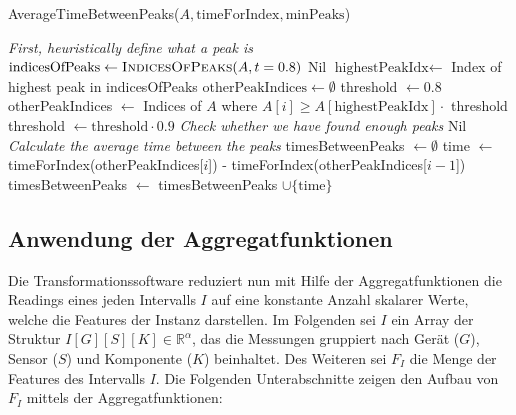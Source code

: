 \begin{algorithm}[hp]
    \caption{AverageTimeBetweenPeaks($A, \text{timeForIndex}, \text{minPeaks}$)}
    \label{algo:avgTimeBetweenPeaks}
    \begin{algorithmic}
        \State \LeftComment \textit{First, heuristically define what a peak is}
        \State $\text{indicesOfPeaks} \gets \Call{IndicesOfPeaks}{A, t = 0.8}$
            \State \Return Nil
        \EndIf
        \State $\text{highestPeakIdx} \gets$ Index of highest peak in indicesOfPeaks
        \State {}
        \State $\text{otherPeakIndices} \gets \emptyset$
        \State threshold $\gets 0.8$
        \Repeat
            \State otherPeakIndices $\gets$ Indices of $A$ where $A[i] \geq A[\text{highestPeakIdx}] \cdot $ threshold
            \State threshold $\gets \text{threshold} \cdot 0.9$
        \State \LeftComment \textit{Check whether we have found enough peaks}
            \State \Return Nil
        \EndIf
        \State \LeftComment \textit{Calculate the average time between the peaks}
        \State timesBetweenPeaks $\gets \emptyset$
            \State time $\gets$ timeForIndex(otherPeakIndices[$i$]) - timeForIndex(otherPeakIndices[$i - 1$])
            \State timesBetweenPeaks $\gets$ timesBetweenPeaks $\cup \{\text{time}\}$
        \EndFor
        \State \Return {}
    \end{algorithmic}
\end{algorithm}

\newpage

\subsection{Anwendung der Aggregatfunktionen}
Die Transformationssoftware reduziert nun mit Hilfe der Aggregatfunktionen die Readings eines jeden Intervalls $I$ auf eine konstante Anzahl skalarer Werte, welche die Features der Instanz darstellen. Im Folgenden sei $I$ ein Array der Struktur $I[G][S][K] \in \mathbb{R}^\alpha$, das die Messungen gruppiert nach Gerät ($G$), Sensor ($S$) und Komponente ($K$) beinhaltet. Des Weiteren sei $F_I$ die Menge der Features des Intervalls $I$. Die Folgenden Unterabschnitte zeigen den Aufbau von $F_I$ mittels der Aggregatfunktionen:
